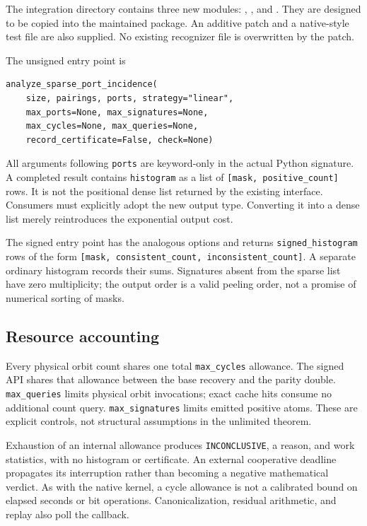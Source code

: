 \documentclass[11pt,letterpaper]{article}
\theoremstyle{definition}\newtheorem{definition}[theorem]{Definition}
\theoremstyle{remark}\newtheorem{remark}[theorem]{Remark}
\newcommand{\api}[1]{\texttt{#1}}
\begin{document}
The integration directory contains three new modules:
, , and . They are designed to be copied into the maintained  package. An additive patch and a native-style test file are also supplied. No existing recognizer file is overwritten by the patch.

The unsigned entry point is
\begin{lstlisting}
analyze_sparse_port_incidence(
    size, pairings, ports, strategy="linear",
    max_ports=None, max_signatures=None,
    max_cycles=None, max_queries=None,
    record_certificate=False, check=None)
\end{lstlisting}
All arguments following \api{ports} are keyword-only in the actual Python signature. A completed result contains \api{histogram} as a list of \api{[mask, positive\_count]} rows. It is not the positional dense list returned by the existing interface. Consumers must explicitly adopt the new output type. Converting it into a dense list merely reintroduces the exponential output cost.

The signed entry point has the analogous options and returns \api{signed\_histogram} rows of the form
\api{[mask, consistent\_count, inconsistent\_count]}. A separate ordinary histogram records their sums. Signatures absent from the sparse list have zero multiplicity; the output order is a valid peeling order, not a promise of numerical sorting of masks.

\subsection{Resource accounting}

Every physical orbit count shares one total \api{max\_cycles} allowance. The signed API shares that allowance between the base recovery and the parity double. \api{max\_queries} limits physical orbit invocations; exact cache hits consume no additional count query. \api{max\_signatures} limits emitted positive atoms. These are explicit controls, not structural assumptions in the unlimited theorem.

Exhaustion of an internal allowance produces \api{INCONCLUSIVE}, a reason, and work statistics, with no histogram or certificate. An external cooperative deadline propagates its interruption rather than becoming a negative mathematical verdict. As with the native kernel, a cycle allowance is not a calibrated bound on elapsed seconds or bit operations. Canonicalization, residual arithmetic, and replay also poll the callback.
\end{document}
